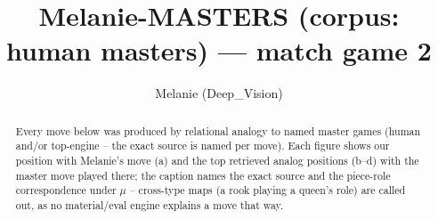 \documentclass[11pt]{article}
\title{Melanie-MASTERS (corpus: human masters) — match game 2}
\author{Melanie (Deep\_Vision)}
\date{}
\begin{document}
\maketitle

\begin{abstract}Every move below was produced by relational analogy to named master games (human and/or top-engine -- the exact source is named per move). Each figure shows our position with Melanie's move (a) and the top retrieved analog positions (b--d) with the master move played there; the caption names the exact source and the piece-role correspondence under $\mu$ -- cross-type maps (a rook playing a queen's role) are called out, as no material/eval engine explains a move that way.\end{abstract}

\begin{figure}[p]\centering
\begin{subfigure}{0.46\textwidth}\centering
\resizebox{\linewidth}{!}{%
\newchessgame
\chessboard[
  setfen={r1bq1rk1/pppp1ppp/3n1b2/8/3P4/8/PPP2PPP/RNBQRBK1 b - - 2 10},
  showmover=false,
  pgfstyle=straightmove, color=movearrow, markmove={f8-e8}
]}
\caption{}
\end{subfigure}\hfill
\begin{subfigure}{0.46\textwidth}\centering
\resizebox{\linewidth}{!}{%
\newchessgame
\chessboard[
  setfen={rnbqrbk1/ppp2ppp/8/3p4/P7/3N1B2/1PPP1PPP/R1BQ1RK1 w - - 2 11},
  showmover=false,
  pgfstyle=straightmove, color=movearrow, markmove={f1-e1}
]}
\caption{}
\end{subfigure}
\\[4pt]
\begin{subfigure}{0.46\textwidth}\centering
\resizebox{\linewidth}{!}{%
\newchessgame
\chessboard[
  setfen={r1bqr1k1/pppp1ppp/3n1b2/8/3P1B2/8/PPP2PPP/RN1QRBK1 b - - 4 11},
  showmover=false,
  pgfstyle=straightmove, color=movearrow, markmove={e8-e1}
]}
\caption{}
\end{subfigure}\hfill
\begin{subfigure}{0.46\textwidth}\centering
\resizebox{\linewidth}{!}{%
\newchessgame
\chessboard[
  setfen={r1bqr1k1/pppp1ppp/3n1b2/8/3P1B2/8/PPP2PPP/RN1QRBK1 b - - 4 11},
  showmover=false,
  pgfstyle=straightmove, color=movearrow, markmove={e8-e1}
]}
\caption{}
\end{subfigure}

\end{figure}
\end{document}
